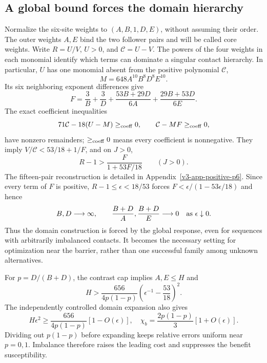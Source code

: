 \documentclass[aps,pre,reprint,amsmath,amssymb,longbibliography]{revtex4-2}
\begin{document}
\subsection{A global bound forces the domain hierarchy}
\label{sec:contrast-design}\label{sec:asymmetric-entry-v2}
Normalize the six-site weights to $(A,B,1,D,E)$, without assuming
their order. The outer weights $A,E$ bind the two follower pairs and
will be called core weights. Write $R=U/V$, $U>0$, and $\mathcal C=U-V$. The powers of the four weights in each monomial identify which
terms can dominate a singular contact hierarchy.
In particular, $U$ has one monomial absent from the positive polynomial $\mathcal C$,
\begin{equation}
 M=648A^{10}B^8D^8E^{10}.
 \label{eq:v4-newton-vertex}
\end{equation}
Its six neighboring exponent differences give
\begin{equation}
 F=\frac3B+\frac3D+
       \frac{53B+29D}{6A}+\frac{29B+53D}{6E}.
 \label{eq:v3-main-F}
\end{equation}
The exact coefficient inequalities 
\begin{equation}
 71\mathcal C-18(U-M)\ge_{\rm coeff}0,\qquad \mathcal C-MF\ge_{\rm coeff}0,
 \label{eq:v4-global-remainders}
\end{equation}
have nonzero remainders; $\ge_{\rm coeff}0$ means every coefficient
is nonnegative. They imply $V/\mathcal C<53/18+1/F$, and on $J>0$,
\begin{equation}
 R-1>\frac{F}{1+53F/18}\qquad(J>0).
 \label{eq:v3-main-global-bound}
\end{equation}
The fifteen-pair reconstruction is detailed in
Appendix~\ref{v3-app-positive-p6}. Since every term of $F$ is
positive, $R-1\le\epsilon<18/53$ forces
$F<\epsilon/(1-53\epsilon/18)$ and hence
\begin{equation}
 B,D\longrightarrow\infty,\qquad
 \frac{B+D}{A},\frac{B+D}{E}\longrightarrow0
       \quad\hbox{as }\epsilon\downarrow0.
 \label{eq:asymmetric-entry-v2}
\end{equation}
Thus the domain construction is forced by the global response, even
for sequences with arbitrarily imbalanced contacts. It becomes the
necessary setting for optimization near the barrier, rather than one
successful family among unknown alternatives.

For $p=D/(B+D)$, the contrast cap implies $A,E\le H$ and
\begin{equation}
 H>\frac{656}{4p(1-p)}
       \left(\epsilon^{-1}-\frac{53}{18}\right)^2.
 \label{eq:v3-main-finite-budget-bound}
\end{equation}
The independently controlled domain expansion also gives
\begin{equation}
 H\epsilon^2\ge\frac{656}{4p(1-p)}[1-O(\epsilon)],
 \quad \chi_b=\frac{2p(1-p)}3[1+O(\epsilon)].
 \label{eq:asymmetric-cost-amplitude-v2}
\end{equation}
Dividing out $p(1-p)$ before expanding keeps relative errors uniform
near $p=0,1$. Imbalance therefore raises the leading cost and suppresses
the benefit susceptibility.
\end{document}
